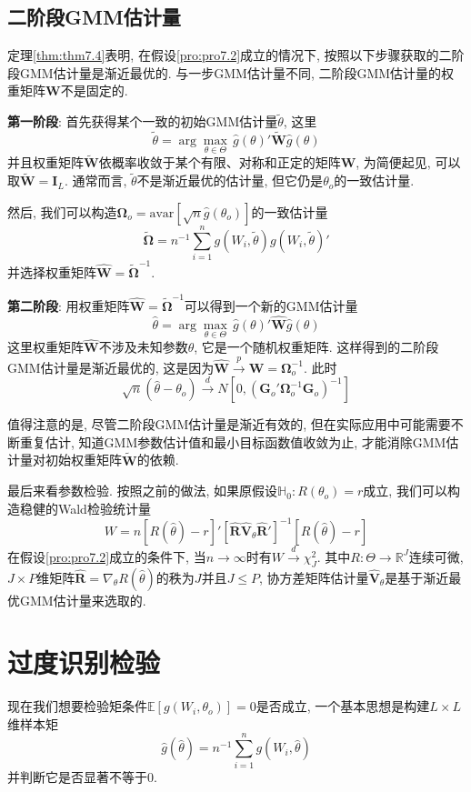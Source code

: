 \documentclass[cn, 12pt, math=mtpro2, bibstyle=apa, blue, twocol]{elegantbook}
\newcommand{\R}{\mathbb{R}}
\newcommand{\RH}{\mathbold{R}}
\newcommand{\E}{\mathbb{E}}
\newcommand{\W}{\mathbold{W}}
\newcommand{\HH}{\mathbb{H}}
\newcommand{\V}{\mathbold{V}}
\newcommand{\BO}{\mathbold{\Omega}}
\newcommand{\G}{\mathbold{G}}
\newcommand{\hth}{\hat{\theta}}
\begin{document}
\subsection{二阶段GMM估计量}
定理\ref{thm:thm7.4}表明, 在假设\ref{pro:pro7.2}成立的情况下, 按照以下步骤获取的二阶段GMM估计量是渐近最优的. 与一步GMM估计量不同, 二阶段GMM估计量的权重矩阵$\W$不是固定的.

\textbf{第一阶段}: 首先获得某个一致的初始GMM估计量$\tilde{\theta}$, 这里
$$\tilde{\theta}=\arg\max_{\theta\in\Theta}\,\hat{g}(\theta)'\tilde{\W}\hat{g}(\theta)$$
并且权重矩阵$\tilde{\W}$依概率收敛于某个有限、对称和正定的矩阵$\W$, 为简便起见, 可以取$\tilde{\W}=\mathbold{I}_L$. 通常而言, $\tilde{\theta}$不是渐近最优的估计量, 但它仍是$\theta_o$的一致估计量.

然后, 我们可以构造$\BO_o=\text{avar}[\sqrt{n}\hat{g}(\theta_o)]$的一致估计量
$$\tilde{\BO}=n^{-1}\sum_{i=1}^{n}g(W_i,\tilde{\theta})g(W_i,\tilde{\theta})'$$
并选择权重矩阵$\hat{\W}=\tilde{\BO}^{-1}$.

\textbf{第二阶段}: 用权重矩阵$\hat{\W}=\tilde{\BO}^{-1}$可以得到一个新的GMM估计量
$$\hat{\theta}=\arg\max_{\theta\in\Theta}\,\hat{g}(\theta)'\hat{\W}\hat{g}(\theta)$$
这里权重矩阵$\hat{\W}$不涉及未知参数$\theta$, 它是一个随机权重矩阵. 这样得到的二阶段GMM估计量是渐近最优的, 这是因为$\hat{\W}\xrightarrow{p}\W=\BO_o^{-1}$. 此时
$$\sqrt{n}(\hat{\theta}-\theta_o)\xrightarrow{d}N[0,(\G_o'\BO_o^{-1}\G_o)^{-1}]$$

值得注意的是, 尽管二阶段GMM估计量是渐近有效的, 但在实际应用中可能需要不断重复估计, 知道GMM参数估计值和最小目标函数值收敛为止, 才能消除GMM估计量对初始权重矩阵$\tilde{\W}$的依赖.

最后来看参数检验. 按照之前的做法, 如果原假设$\HH_0:R(\theta_o)=r$成立, 我们可以构造稳健的Wald检验统计量
$$W=n[R(\hat{\theta})-r]'[\hat{\RH}\hat{\V}_\theta\hat{\RH}']^{-1}[R(\hat{\theta})-r]$$
在假设\ref{pro:pro7.2}成立的条件下, 当$n\to\infty$时有$W\xrightarrow{d}\chi^2_J$. 其中$R:\Theta\to \R^J$连续可微, $J\times P$维矩阵$\hat{\RH}=\nabla_\theta R(\hth)$的秩为$J$并且$J\leq P$, 协方差矩阵估计量$\hat{\V}_\theta$是基于渐近最优GMM估计量来选取的.
\section{过度识别检验}
现在我们想要检验矩条件$\E[g(W_i,\theta_o)]=0$是否成立, 一个基本思想是构建$L\times L$维样本矩
$$\hat{g}(\hat{\theta})=n^{-1}\sum_{i=1}^{n}g(W_i,\hat{\theta})$$
并判断它是否显著不等于0.
\end{document}
